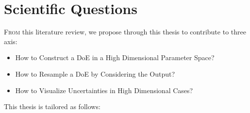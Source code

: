 


\chapter{Scientific Questions}\label{chap:questions}

\lettrine{F}{rom} this literature review, we propose through this thesis to contribute to three axis:

\begin{itemize}
\item How to Construct a DoE in a High Dimensional Parameter Space?
\item How to Resample a DoE by Considering the Output?
\item How to Visualize Uncertainties in High Dimensional Cases?
\end{itemize}

This thesis is tailored as follows:






